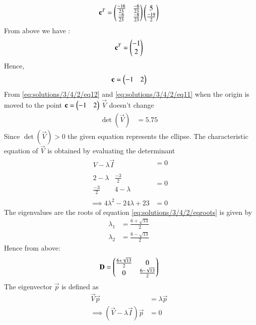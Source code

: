 \begin{align}
\mathbf{c}^T=
\begin{pmatrix}
\frac{-16}{23} &\frac{-6}{23}\\
\frac{-6}{23}& \frac{-8}{23}
\end{pmatrix}
\begin{pmatrix}
5 \\\frac{-19}{2}
\end{pmatrix}
\end{align}
From above we have :
\begin{align}
 \mathbf{c}^T=
 \begin{pmatrix}
 -1\\2
 \end{pmatrix}
\end{align}
Hence,
\begin{align}
 \mathbf c=
\begin{pmatrix}
-1 &2\end{pmatrix}
\end{align}
From \eqref{eq:solutions/3/4/2/eq12} and \eqref{eq:solutions/3/4/2/eq11} when the origin is moved to the point  $\mathbf {c} = \begin{pmatrix}-1 &2\end{pmatrix}$  $\vec{V}$ doesn't change
\begin{align}
    \det(\vec{V})&=5.75
\end{align}
Since $\det(\vec{V})>0$ the given equation represents the ellipse.
The characteristic equation of $\vec{V}$ is obtained by evaluating the determinant 
\begin{align}
       \begin{array}{|c|}
V-\lambda\vec{I}
\end{array}&=0\\
   \begin{array}{|cc|}
2-\lambda & \frac{-3}{2} \\ \frac{-3}{2} & 4-\lambda
\end{array}&=0\\
\implies 4\lambda^2-24\lambda+23&=0\label{eq:solutions/3/4/2/eqroots}
\end{align}
The eigenvalues are the roots of equation \ref{eq:solutions/3/4/2/eqroots} is given by 
\begin{align}
    \lambda_1&=\frac{6+\sqrt{13}}{2}\label{eq:solutions/3/4/2/eqeig1}\\
    \lambda_2&=\frac{6-\sqrt{13}}{2}\label{eq:solutions/3/4/2/eqeig2}
\end{align}
Hence from above:
\begin{align}\label{eq:solutions/3/4/2/d}
    \mathbf{D}=
    \begin{pmatrix}
    \frac{6+\sqrt{13}}{2} & 0\\
     0 &\frac{6-\sqrt{13}}{2}
    \end{pmatrix}
\end{align}
The eigenvector $\vec{p}$ is defined as 
\begin{align}
    \vec{V}\vec{p}&=\lambda\vec{p}\\
    \implies (\vec{V}-\lambda\vec{I})\vec{p}&=0\label{eq:solutions/3/4/2/eqev}
\end{align}
